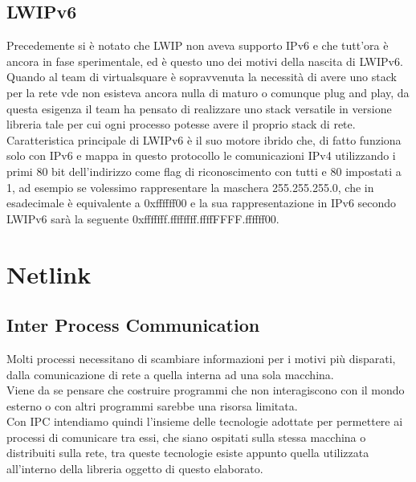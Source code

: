 \subsection{LWIPv6}
Precedemente si \`e notato che LWIP non aveva supporto IPv6 e che tutt'ora \`e ancora in fase sperimentale, ed \`e questo uno dei motivi della nascita di LWIPv6.\\
Quando al team di virtualsquare \`e sopravvenuta la necessit\`a di avere uno stack per la rete vde non esisteva ancora nulla di maturo o comunque plug and play, da questa esigenza il team ha pensato di realizzare uno stack versatile in versione libreria tale per cui ogni processo potesse avere il proprio stack di rete.\\
Caratteristica principale di LWIPv6 \`e il suo motore ibrido che, di fatto funziona solo con IPv6 e mappa in questo protocollo le comunicazioni IPv4 utilizzando i primi 80 bit dell'indirizzo come flag di riconoscimento con tutti e 80 impostati a 1, ad esempio se volessimo rappresentare la maschera 255.255.255.0, che in esadecimale \`e equivalente a 0xffffff00 e la sua rappresentazione in IPv6 secondo LWIPv6 sar\`a la seguente 0xfffffff.ffffffff.ffffFFFF.ffffff00.
\section{Netlink}
\subsection{Inter Process Communication}
Molti processi necessitano di scambiare informazioni per i motivi pi\`u disparati, dalla comunicazione di rete a quella interna ad una sola macchina.\\
Viene da se pensare che costruire programmi che non interagiscono con il mondo esterno o con altri programmi sarebbe una risorsa limitata.\\
Con IPC intendiamo quindi l'insieme delle tecnologie adottate per permettere ai processi di comunicare tra essi, che siano ospitati sulla stessa macchina o distribuiti sulla rete, tra queste tecnologie esiste appunto quella utilizzata all'interno della libreria oggetto di questo elaborato.
